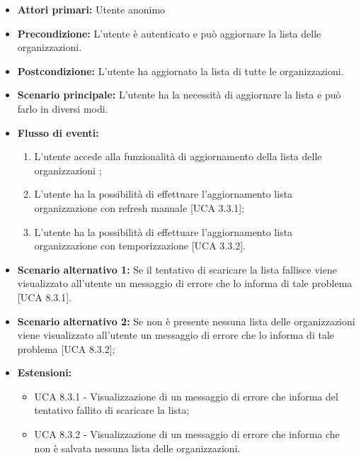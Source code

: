 \begin{itemize} 
	\item \textbf{Attori primari:} Utente anonimo
	\item \textbf{Precondizione:} L'utente è autenticato e può aggiornare la lista delle organizzazioni.
	\item \textbf{Postcondizione:} L'utente ha aggiornato la lista di tutte le organizzazioni.
	\item \textbf{Scenario principale:} L'utente ha la necessità di aggiornare la lista e può farlo in diversi modi.
	\item \textbf{Flusso di eventi:}
	\begin{enumerate}
		\item L'utente accede alla funzionalità di aggiornamento della lista delle organizzazioni\ap{G} ;
		\item L'utente ha la possibilità di effettuare l'aggiornamento lista organizzazione con refresh manuale [UCA 3.3.1];
		\item L'utente ha la possibilità di effettuare l'aggiornamento lista organizzazione con temporizzazione [UCA 3.3.2].
	\end{enumerate}
	\item \textbf{Scenario alternativo 1:} Se il tentativo di scaricare la lista fallisce viene visualizzato all'utente un messaggio di errore che lo informa di tale problema [UCA 8.3.1].
	\item \textbf{Scenario alternativo 2:} Se non è presente nessuna lista delle organizzazioni viene visualizzato all'utente un messaggio di errore che lo informa di tale problema [UCA 8.3.2];
	\item \textbf{Estensioni:}
	\begin{itemize}
		\item UCA 8.3.1 - Visualizzazione di un messaggio di errore che informa del tentativo fallito di scaricare la lista;
		\item UCA 8.3.2 - Visualizzazione di un messaggio di errore che informa che non è salvata nessuna lista delle organizzazioni.
	\end{itemize}
\end{itemize}

